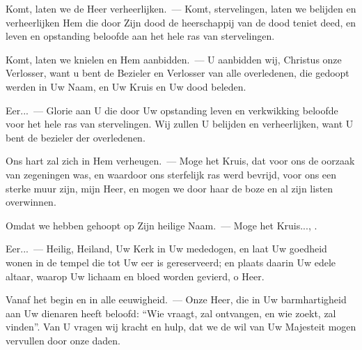 \documentclass[12pt,twoside,a5paper]{article}
\begin{document}

\begin{halfparskip}
  Komt, laten we de Heer verheerlijken.~--- Komt, stervelingen, laten we belijden en verheerlijken Hem die door Zijn dood de heerschappij van de dood teniet deed, en leven en opstanding beloofde aan het hele ras van stervelingen.

  Komt, laten we knielen en Hem aanbidden.~--- U aanbidden wij, Christus onze Verlosser, want u bent de Bezieler en Verlosser van alle overledenen, die gedoopt werden in Uw Naam, en Uw Kruis en Uw dood beleden.

  Eer...~--- Glorie aan U die door Uw opstanding leven en verkwikking beloofde voor het hele ras van
  stervelingen. Wij zullen U belijden en verheerlijken, want U bent de bezieler der overledenen.
\end{halfparskip}


\begin{halfparskip}
  Ons hart zal zich in Hem verheugen.~--- Moge het Kruis, dat voor ons de oorzaak van zegeningen was, en waardoor ons sterfelijk ras werd bevrijd, voor ons een sterke muur zijn, mijn Heer, en mogen we door haar de boze en al zijn listen overwinnen.

  Omdat we hebben gehoopt op Zijn heilige Naam.~--- Moge het Kruis..., .

  Eer...~--- Heilig, Heiland, Uw Kerk in Uw mededogen, en laat Uw goedheid wonen in de tempel die tot Uw eer is gereserveerd; en plaats daarin Uw edele altaar, waarop Uw lichaam en bloed worden gevierd, o Heer.

  Vanaf het begin en in alle eeuwigheid.~--- Onze Heer, die in Uw barmhartigheid aan Uw dienaren heeft beloofd: ``Wie vraagt, zal ontvangen, en wie zoekt, zal vinden''. Van U vragen wij kracht en hulp, dat we de wil van Uw Majesteit mogen vervullen door onze daden.
\end{halfparskip}

\end{document}
